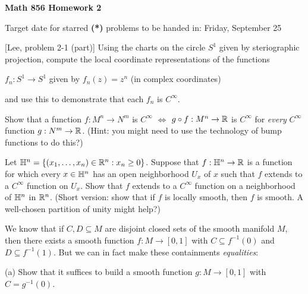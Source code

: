 
\nopagenumbers


\loadmsbm

\def\ctln{\centerline}
\def\ssk{\smallskip}
\def\msk{\medskip}
\def\bsk{\bigskip}
\def\nidt{\noindent}
\def\del{\partial}
\def\bbr{{\Bbb R}}
\def\ra{\rightarrow}
\def\lra{$\Leftrightarrow$}


\ctln{\bf Math 856 Homework 2}

\ssk

\ctln{Target date for starred {\bf (*)} problems to be handed in: Friday, September 25}

\bsk


\nidt {\bf (*) 7:} [Lee, problem 2-1 (part)] Using the charts on the circle $S^1$ given 
by steriographic projection, compute the local coordinate representations of the functions

\ssk

\ctln{$f_n:S^1\rightarrow S^1$ given by $f_n(z)=z^n$ (in complex coordinates)}

\ssk

and use this to demonstrate that each $f_n$ is $C^\infty$.

\msk

\nidt {\bf (*) 8:} Show that a function $f:M^n\rightarrow N^m$ is $C^\infty$ $\Leftrightarrow$ 
$g\circ f:M^n\rightarrow {\Bbb R}$ is $C^\infty$ for {\it every} $C^\infty$ function
$g:N^m\rightarrow {\Bbb R}$. (Hint: you might need to use the technology of bump functions
to do this?)

\msk

\nidt {\bf 9:} Let ${\Bbb H}^n=\{(x_1,\ldots,x_n)\in\bbr^n : x_n\geq 0\}$. Suppose that 
$f:{\Bbb H}^n\rightarrow \bbr$ is a function for which every $x\in {\Bbb H}^n$ has an open 
neighborhood $U_x$ of $x$ such that $f$ extends to a $C^\infty$ function on $U_x$. Show that $f$ extends
to a $C^\infty$ function on a neighborhood of ${\Bbb H}^n$ in $\bbr^n$. 
(Short version: show that if $f$ is locally smooth, then $f$ is smooth. A well-chosen partition
of unity might help?)

\msk

\nidt {\bf 10:} We know that if $C,D\subseteq M$ are disjoint closed sets of the smooth manifold $M$,
then there exists a smooth function $f:M\ra [0,1]$ with $C\subseteq f^{-1}(0)$ and $D\subseteq f^{-1}(1)$.
But we can in fact make these containments {\it equalities}:

\ssk

(a) Show that it suffices to build a smooth function $g:M\ra [0,1]$ with $C=g^{-1}(0)$.


